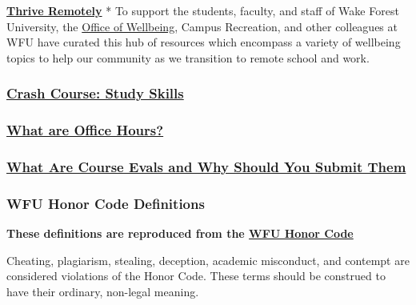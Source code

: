 \documentclass[
]{book}
\begin{document}
\textbf{\href{https://thrive.wfu.edu/thrive-remotely-2/}{Thrive Remotely}}
* To support the students, faculty, and staff of Wake Forest University, the \href{https://thrive.wfu.edu/}{Office of Wellbeing}, Campus Recreation, and other colleagues at WFU have curated this hub of resources which encompass a variety of wellbeing topics to help our community as we transition to remote school and work.

\hypertarget{crash-course-study-skills}{%
\subsubsection{\texorpdfstring{\href{https://www.youtube.com/watch?v=E7CwqNHn_Ns\&list=PL8dPuuaLjXtNcAJRf3bE1IJU6nMfHj86W}{Crash Course: Study Skills}}{Crash Course: Study Skills}}\label{crash-course-study-skills}}

\hypertarget{what-are-office-hours}{%
\subsubsection{\texorpdfstring{\href{https://vimeo.com/270014784?embedded=true\&source=vimeo_logo\&owner=2248721}{What are Office Hours?}}{What are Office Hours?}}\label{what-are-office-hours}}

\hypertarget{what-are-course-evals-and-why-should-you-submit-them}{%
\subsubsection{\texorpdfstring{\href{https://www.youtube.com/watch?v=5zkAOpx8Qk8}{What Are Course Evals and Why Should You Submit Them}}{What Are Course Evals and Why Should You Submit Them}}\label{what-are-course-evals-and-why-should-you-submit-them}}

\hypertarget{wfu-honor-code-definitions}{%
\subsubsection{WFU Honor Code Definitions}\label{wfu-honor-code-definitions}}

\textbf{These definitions are reproduced from the \href{https://studentconduct.wfu.edu/procedures-of-the-honor-and-ethics-council/}{WFU Honor Code}}

Cheating, plagiarism, stealing, deception, academic misconduct, and contempt are considered violations of the Honor Code. These terms should be construed to have their ordinary, non-legal meaning.
\end{document}
